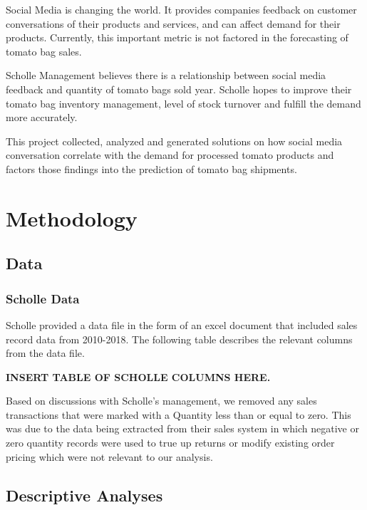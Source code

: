 \documentclass[12pt,oneside]{chicagocapstone}
\begin{document}
Social Media is changing the world. It provides companies feedback on
customer conversations of their products and services, and can affect
demand for their products. Currently, this important metric is not
factored in the forecasting of tomato bag sales.

Scholle Management believes there is a relationship between social media
feedback and quantity of tomato bags sold year. Scholle hopes to improve
their tomato bag inventory management, level of stock turnover and
fulfill the demand more accurately.

This project collected, analyzed and generated solutions on how social
media conversation correlate with the demand for processed tomato
products and factors those findings into the prediction of tomato bag
shipments.

\chapter*{Methodology}\label{methodology}

\section*{Data}\label{methodology-data}

\subsection*{Scholle Data}\label{methodology-scholle}

Scholle provided a data file in the form of an excel document that
included sales record data from 2010-2018. The following table describes
the relevant columns from the data file.

\textbf{INSERT TABLE OF SCHOLLE COLUMNS HERE.}

Based on discussions with Scholle's management, we removed any sales
transactions that were marked with a Quantity less than or equal to
zero. This was due to the data being extracted from their sales system
in which negative or zero quantity records were used to true up returns
or modify existing order pricing which were not relevant to our
analysis.

\section*{Descriptive Analyses}\label{methodology-Descriptive-Analyses}
\end{document}
